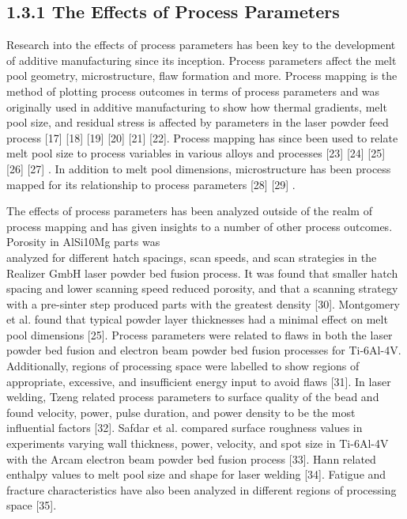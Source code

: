 \documentclass[10pt]{article}
\begin{document}
\subsection*{1.3.1 The Effects of Process Parameters}
Research into the effects of process parameters has been key to the development of additive manufacturing since its inception. Process parameters affect the melt pool geometry, microstructure, flaw formation and more. Process mapping is the method of plotting process outcomes in terms of process parameters and was originally used in additive manufacturing to show how thermal gradients, melt pool size, and residual stress is affected by parameters in the laser powder feed process [17] [18] [19] [20] [21] [22]. Process mapping has since been used to relate melt pool size to process variables in various alloys and processes [23] [24] [25] [26] [27] . In addition to melt pool dimensions, microstructure has been process mapped for its relationship to process parameters [28] [29] .

The effects of process parameters has been analyzed outside of the realm of process mapping and has given insights to a number of other process outcomes. Porosity in AlSi10Mg parts was\\
analyzed for different hatch spacings, scan speeds, and scan strategies in the Realizer GmbH laser powder bed fusion process. It was found that smaller hatch spacing and lower scanning speed reduced porosity, and that a scanning strategy with a pre-sinter step produced parts with the greatest density [30]. Montgomery et al. found that typical powder layer thicknesses had a minimal effect on melt pool dimensions [25]. Process parameters were related to flaws in both the laser powder bed fusion and electron beam powder bed fusion processes for Ti-6Al-4V. Additionally, regions of processing space were labelled to show regions of appropriate, excessive, and insufficient energy input to avoid flaws [31]. In laser welding, Tzeng related process parameters to surface quality of the bead and found velocity, power, pulse duration, and power density to be the most influential factors [32]. Safdar et al. compared surface roughness values in experiments varying wall thickness, power, velocity, and spot size in Ti-6Al-4V with the Arcam electron beam powder bed fusion process [33]. Hann related enthalpy values to melt pool size and shape for laser welding [34]. Fatigue and fracture characteristics have also been analyzed in different regions of processing space [35].
\end{document}
